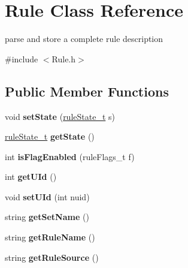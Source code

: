 \hypertarget{classRule}{}\section{Rule Class Reference}
\label{classRule}


parse and store a complete rule description  




{\ttfamily \#include $<$Rule.\+h$>$}

\subsection*{Public Member Functions}
\begin{DoxyCompactItemize}
\item 
\mbox{\label{classRule_ab3da1447204ec745c198b78a45f58f5a}} 
void {\bfseries set\+State} (\hyperlink{Rule_8h_ada0a7708a8188fca42891bcefcc55322}{rule\+State\+\_\+t} s)
\item 
\mbox{\label{classRule_a77a8c310ca705429a6d083b8dcd81043}} 
\hyperlink{Rule_8h_ada0a7708a8188fca42891bcefcc55322}{rule\+State\+\_\+t} {\bfseries get\+State} ()
\item 
\mbox{\label{classRule_ae4709d88a7fe42b30488def531652b7d}} 
int {\bfseries is\+Flag\+Enabled} (rule\+Flags\+\_\+t f)
\item 
\mbox{\label{classRule_abda94111e2d42e0719ff22f961de64a6}} 
int {\bfseries get\+U\+Id} ()
\item 
\mbox{\label{classRule_ac7a9ed77e78ecd7bd35887fba4ad44d0}} 
void {\bfseries set\+U\+Id} (int nuid)
\item 
\mbox{\label{classRule_a9e442e10cbbb90ea94de2bf931120662}} 
string {\bfseries get\+Set\+Name} ()
\item 
\mbox{\label{classRule_a4fb86d5cc62efdd5c6dd44dfde8fbdba}} 
string {\bfseries get\+Rule\+Name} ()
\item 
\mbox{\label{classRule_ae2d8226afc17d3f0d661b2d462d4c7eb}} 
string {\bfseries get\+Rule\+Source} ()
\item 
\mbox{\label{classRule_ab6751b839ab0a0538fc2d29d85cf2fff}} 

\end{DoxyCompactItemize}
